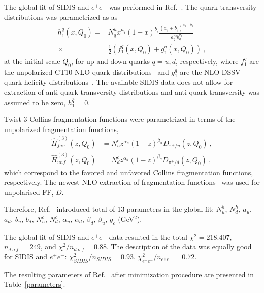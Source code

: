 \documentclass[twocolumn,showpacs,preprintnumbers,amsmath,amssymb,floatfix,prd]{revtex4}
\begin{document}
The global fit of SIDIS and $e^+e^-$ was performed in Ref.~\cite{Kang:2015msa}. 
The quark transversity distributions was parametrized as
as
\begin{align}
h_1^{q}(x,Q_0)= & N_{q}^h x^{a_{q}}(1-x)^{b_{q}} \frac{(a_{q} + b_{q})^{a_{q} + b_{q}}}
{a_{q}^{a_{q}} b_{q}^{b_{q}}}\nonumber \\
\times & \frac{1}{2}\left (f_{1}^q(x,Q_0) + g_{1}^q(x,Q_0)  \right ) \ ,
\end{align}
at the initial scale $Q_0$, for up and down quarks $q=u,d$, respectively, where $f_{1}^q$ are the unpolarized
CT10 NLO quark distributions~\cite{Lai:2010vv} and $g_{1}^q$ are the NLO DSSV quark helicity distributions~\cite{deFlorian:2009vb}. The available SIDIS data does not allow for extraction of anti-quark transversity distributions and anti-quark transversity was assumed to be zero, $h_1^{\bar q} = 0$. 

Twist-3 Collins fragmentation functions were parametrized in terms of the unpolarized fragmentation functions,
\begin{align}
\hat{H}_{fav}^{(3)}(z,Q_0)&= N_{u}^c z^{\alpha_{u}}(1-z)^{\beta_{u}} D_{\pi^+/u}(z,Q_0) \ , \\
\hat{H}_{unf}^{(3)}(z,Q_0)&= N_{d}^c z^{\alpha_{d}}(1-z)^{\beta_{d}} D_{\pi^+/d}(z,Q_0) \ , 
\end{align}
which correspond to the favored and unfavored Collins
fragmentation functions, respectively. 
  The newest NLO extraction of fragmentation functions~\cite{deFlorian:2014xna} was used for unpolarised FF, $D$. 
  
  
 
 
 Therefore, Ref.~\cite{Kang:2015msa} introduced total of 13 parameters in the global fit:
 $N_u^h$, $N_d^h$, $a_u$, $a_d$, $b_u$, $b_d$, $N_u^c$, $N_d^c$, $\alpha_u$, $\alpha_d$, $\beta_d$, $\beta_u$, $g_c$ (GeV$^2$).  

 The global fit of SIDIS and $e^+e^-$ data  resulted in the total  $\chi^2 =  218.407 $, $n_{d.o.f.} = 249$, and 
$\chi^2/n_{d.o.f} = 0.88$. The description of the data was  equally good for SIDIS and $e^+e^-$:  $\chi^2_{SIDIS}/{n_{SIDIS}} =  0.93$, $\chi^2_{e^+e^-}/{n_{e^+e^-}} =  0.72$.  

The resulting parameters of  Ref.~\cite{Kang:2015msa} after minimization procedure are presented in Table~\ref{parameters}.
\end{document}
